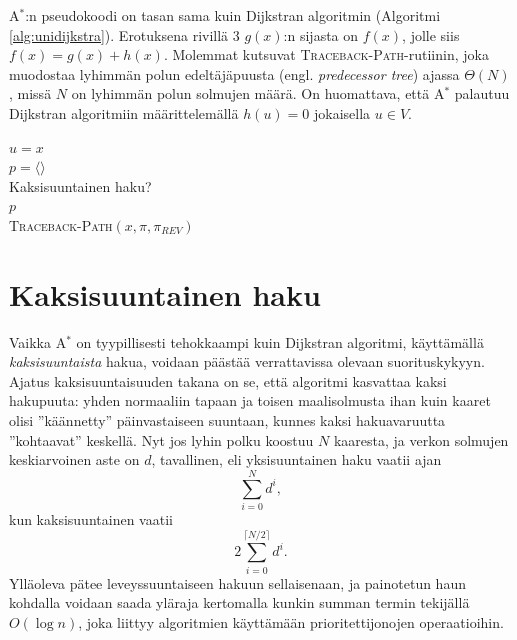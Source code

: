 \documentclass[finnish]{tktltiki2}
\newenvironment{finalgo}[1][htb]{
  \renewcommand{\algorithmcfname}{Algoritmi}
  \begin{algorithm}[#1]
}{\end{algorithm}}
\let\oldnl\nl%
\newcommand{\nonl}{\renewcommand{\nl}{\let\nl\oldnl}}
\theoremstyle{definition}
\theoremstyle{remark}
\begin{document}
\noindent A$^{\ast}$:n pseudokoodi on tasan sama kuin Dijkstran algoritmin (Algoritmi \ref{alg:unidijkstra}). Erotuksena rivillä 3 $g(x)$:n sijasta on $f(x)$, jolle siis $f(x) = g(x) + h(x)$. Molemmat kutsuvat \textsc{Traceback-Path}-rutiinin, joka muodostaa lyhimmän polun edeltäjäpuusta (engl. \textit{predecessor tree}) ajassa $\Theta(N)$, missä $N$ on lyhimmän polun solmujen määrä. On huomattava, että A$^{\ast}$ palautuu Dijkstran algoritmiin määrittelemällä $h(u) = 0$ jokaisella $u \in V$.
\begin{finalgo}
$u = x$ \\
$p = \langle  \rangle$ \\
\nonl Kaksisuuntainen haku? \\
\KwRet $p$ \\
\caption{\textsc{Traceback-Path}$(x, \pi, \pi_{REV})$}
\label{alg:tracebackpath}
\end{finalgo}

\section{Kaksisuuntainen haku}
Vaikka A$^{\ast}$ on tyypillisesti tehokkaampi kuin Dijkstran algoritmi, käyttämällä \textit{kaksisuuntaista} hakua, voidaan päästää verrattavissa olevaan suorituskykyyn. Ajatus kaksisuuntaisuuden takana on se, että algoritmi kasvattaa kaksi hakupuuta: yhden normaaliin tapaan ja toisen maalisolmusta ihan kuin kaaret olisi ''käännetty'' päinvastaiseen suuntaan, kunnes kaksi hakuavaruutta ''kohtaavat'' keskellä. Nyt jos lyhin polku koostuu $N$ kaaresta, ja verkon solmujen keskiarvoinen aste on $d$, tavallinen, eli yksisuuntainen haku vaatii ajan
\[
\sum_{i = 0}^N d^i,
\]
kun kaksisuuntainen vaatii
\[
2 \sum_{i = 0}^{\lceil N / 2 \rceil} d^i.
\]
Ylläoleva pätee leveyssuuntaiseen hakuun sellaisenaan, ja painotetun haun kohdalla voidaan saada yläraja kertomalla kunkin summan termin tekijällä $O(\log n)$, joka liittyy algoritmien käyttämään prioritettijonojen operaatioihin. 
\end{document}
